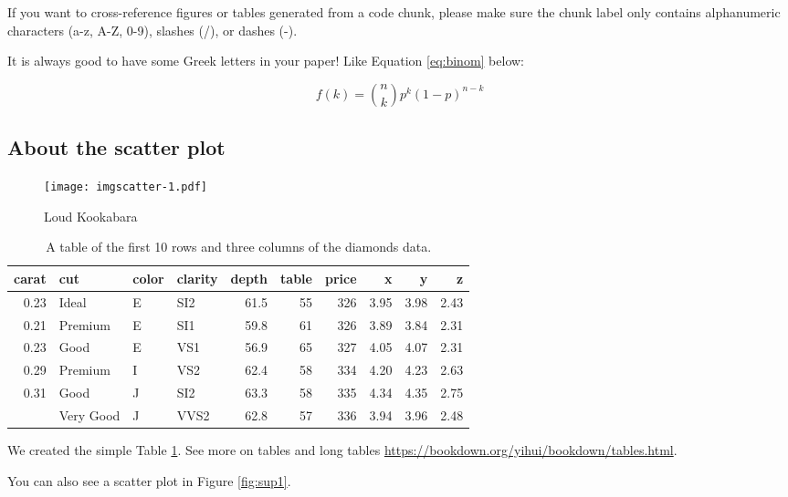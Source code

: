 \documentclass[12pt,]{article}
\begin{document}
If you want to cross-reference figures or tables generated from a code
chunk, please make sure the chunk label only contains alphanumeric
characters (a-z, A-Z, 0-9), slashes (/), or dashes (-).

It is always good to have some Greek letters in your paper! Like
Equation \eqref{eq:binom} below:

\begin{equation} 
  f\left(k\right) = \binom{n}{k} p^k\left(1-p\right)^{n-k}
  \label{eq:binom}
\end{equation}

\subsection{About the scatter plot}\label{about-the-scatter-plot}

\begin{figure}
\centering
\texttt{[image: imgscatter-1.pdf]}
\caption{\label{fig:scatter}Loud Kookabara}
\end{figure}

\begin{table}[t]

\caption{\label{tab:tree-diamonds}A table of the first 10 rows and three columns of the diamonds data.}
\centering
\begin{tabular}{rlllrrrrrr}
\toprule
carat & cut & color & clarity & depth & table & price & x & y & z\\
\midrule
0.23 & Ideal & E & SI2 & 61.5 & 55 & 326 & 3.95 & 3.98 & 2.43\\
0.21 & Premium & E & SI1 & 59.8 & 61 & 326 & 3.89 & 3.84 & 2.31\\
0.23 & Good & E & VS1 & 56.9 & 65 & 327 & 4.05 & 4.07 & 2.31\\
0.29 & Premium & I & VS2 & 62.4 & 58 & 334 & 4.20 & 4.23 & 2.63\\
0.31 & Good & J & SI2 & 63.3 & 58 & 335 & 4.34 & 4.35 & 2.75\\
\addlinespace
0.24 & Very Good & J & VVS2 & 62.8 & 57 & 336 & 3.94 & 3.96 & 2.48\\
\bottomrule
\end{tabular}
\end{table}

We created the simple Table \ref{tab:tree-diamonds}. See more on tables
and long tables \url{https://bookdown.org/yihui/bookdown/tables.html}.

You can also see a scatter plot in Figure \ref{fig:sup1}.
\end{document}
